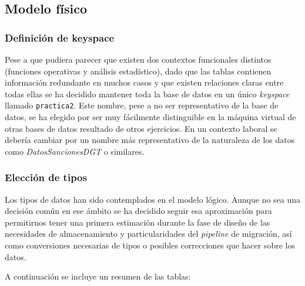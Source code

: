 \documentclass[]{article}
\begin{document}
\subsection{Modelo físico}
\label{subsec:modelo_fisico}

\subsubsection{Definición de keyspace}
\label{subsec:keyspace}
Pese a que pudiera parecer que existen dos contextos funcionales distintos
(funciones operativas y análisis estadístico), dado que las tablas contienen
información redundante en muchos casos y que existen relaciones claras entre
todas ellas se ha decidido mantener toda la base de datos en un único
\textit{keyspace} llamado \texttt{practica2}. Este nombre, pese a no ser
representativo de la base de datos, se ha elegido por ser muy fácilmente
distinguible en la máquina virtual de otras bases de datos resultado de otros
ejercicios. En un contexto laboral se debería cambiar por un nombre más
representativo de la naturaleza de los datos como \textit{DatosSancionesDGT} o
similares.

\subsubsection{Elección de tipos}

Los tipos de datos han sido contemplados en el modelo lógico. Aunque no sea una
decisión común en ese ámbito se ha decidido seguir esa aproximación para
permitirnos tener una primera estimación durante la fase de diseño de las
necesidades de almacenamiento y particularidades del \textit{pipeline} de
migración, así como conversiones necesarias de tipos o posibles correcciones
que hacer sobre los datos.

A continuación se incluye un resumen de las tablas: 
\end{document}

